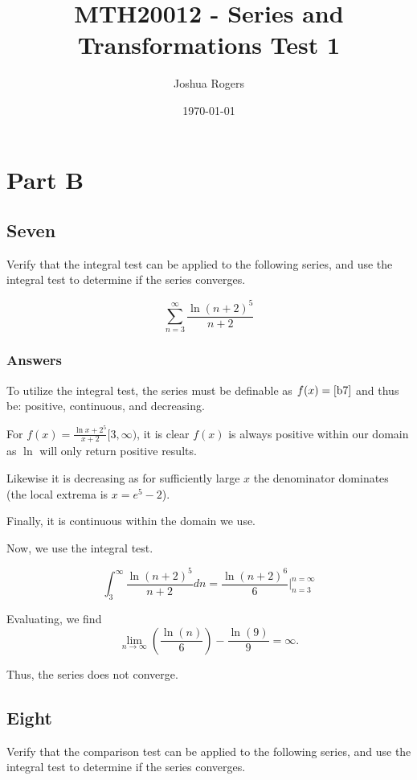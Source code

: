 \documentclass{article}
\title{\vspace{-4cm}MTH20012 - Series and Transformations Test 1}
\author{Joshua Rogers}
\date\today
\begin{document}
\maketitle 

\section*{Part B}
\subsection*{Seven}

Verify that the integral test can be applied to the following series, and use the integral test to determine if the series converges.

\begin{equation}\label{b7}
\sum_{n=3}^{\infty} \frac{\ln{(n+2)}^5}{n+2}
\end{equation}

\subsubsection*{Answers}

To utilize the integral test, the series must be definable as $f(x) = \ref{b7}$ and thus be: positive, continuous, and decreasing.

For $f(x) = \frac{\ln{x+2}^5}{x+2} [3,\infty)$, it is clear $f(x)$ is always positive within our domain as $\ln$ will only return positive results.

Likewise it is decreasing as for sufficiently large $x$ the denominator dominates (the local extrema is $x=e^5-2$).

Finally, it is continuous within the domain we use.

Now, we use the integral test.

\[
\int_3^\infty \frac {\ln(n+2)^5}{n+2}dn = \frac{\ln(n+2)^6}{6}\Bigr|_{n=3}^{n=\infty}
\]

Evaluating, we find
\[
\lim_{n\to\infty}\left(\frac{\ln(n)}{6}\right) - \frac{\ln(9)}{9} = \infty.
\]

Thus, the series does not converge.

\par

\subsection*{Eight}

Verify that the comparison test can be applied to the following series, and use the integral test to determine if the series converges.
\end{document}
